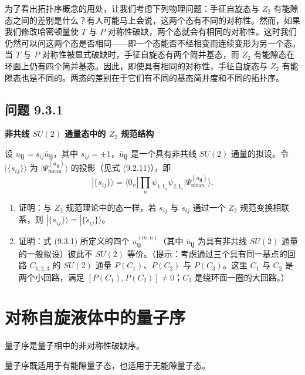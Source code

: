 为了看出拓扑序概念的用处，让我们考虑下列物理问题：手征自旋态与 $Z_2$ 有能隙态之间的差别是什么？有人可能马上会说，这两个态有不同的对称性。然而，如果我们修改哈密顿量使 $T$ 与 $P$ 对称性破缺，两个态就会有相同的对称性。这时我们仍然可以问这两个态是否相同——即一个态能否不经相变而连续变形为另一个态。当 $T$ 与 $P$ 对称性被显式破缺时，手征自旋态有两个简并基态，而 $Z_2$ 有能隙态在环面上仍有四个简并基态。因此，即使具有相同的对称性，手征自旋态与 $Z_2$ 有能隙态也是不同的。两态的差别在于它们有不同的基态简并度和不同的拓扑序。

\subsection*{问题 9.3.1}

\textbf{非共线 $SU(2)$ 通量态中的 $Z_2$ 规范结构}

设 $u_{\pmb{ij}}=s_{ij}\bar{u}_{\pmb{ij}}$，其中 $s_{ij}=\pm1$，$\bar{u}_{\pmb{ij}}$ 是一个具有非共线 $SU(2)$ 通量的拟设。令 $|\{s_{ij}\}\rangle$ 为 $|\Psi_{\text{mean}}^{(u_{\pmb{ij}})}\rangle$ 的投影（见式 (9.2.11)），即
\begin{equation*}
|\{s_{ij}\}\rangle=\langle0_{\psi}|\prod_n\psi_{1,\pmb{i}_n}\psi_{2,\pmb{i}_n}|\Psi_{\text{mean}}^{(u_{\pmb{ij}})}\rangle.
\end{equation*}
\begin{enumerate}[label=(\alph*)]
\item 证明：与 $Z_2$ 规范理论中的态一样，若 $s_{ij}$ 与 $\tilde{s}_{ij}$ 通过一个 $Z_2$ 规范变换相联系，则 $|\{s_{ij}\}\rangle=|\{\tilde{s}_{ij}\}\rangle$。
\item 证明：式 (9.3.1) 所定义的四个 $u_{\pmb{ij}}^{(m,n)}$（其中 $\bar{u}_{\pmb{ij}}$ 为具有非共线 $SU(2)$ 通量的一般拟设）彼此不 $SU(2)$ 等价。（提示：考虑通过三个具有同一基点的回路 $C_{1,2,3}$ 的 $SU(2)$ 通量 $P(C_1)$、$P(C_2)$ 与 $P(C_3)$。这里 $C_1$ 与 $C_2$ 是两个小回路，满足 $[P(C_1),P(C_2)]\neq0$；$C_3$ 是绕环面一圈的大回路。）
\end{enumerate}

\section{对称自旋液体中的量子序}

\begin{keypoints}
\item 量子序是量子相中的非对称性破缺序。
\item 量子序既适用于有能隙量子态，也适用于无能隙量子态。
\end{keypoints}

